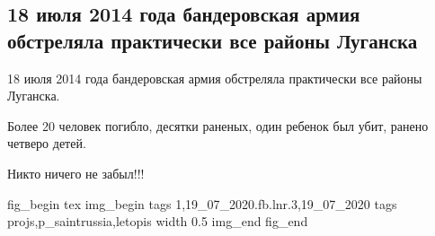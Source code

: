  
 

\subsection{18 июля 2014 года бандеровская армия обстреляла практически все районы Луганска}
\label{sec:19_07_2020.fb.lnr.3}
  
18 июля 2014 года бандеровская армия обстреляла практически все районы
Луганска.

Более 20 человек погибло, десятки раненых, один ребенок был убит, ранено
четверо детей.

Никто ничего не забыл!!!

\ifcmt
fig_begin 
  tex \centering
  img_begin 
    tags 1,19_07_2020.fb.lnr.3,19_07_2020
    tags projs,p_saintrussia,letopis
    width 0.5
  img_end
fig_end
\fi
